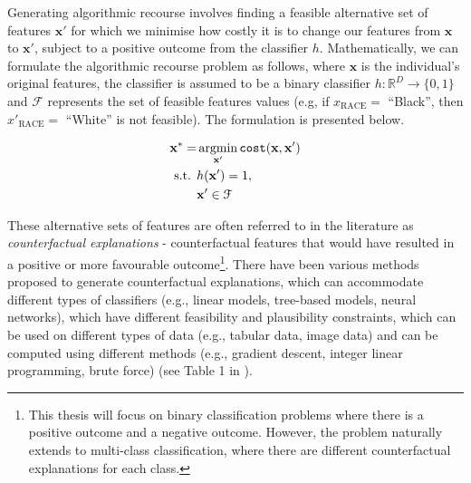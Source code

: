 Generating algorithmic recourse involves finding a feasible alternative set of features $\mathbf{x}'$ for which we minimise how costly it is to change our features from $\mathbf{x}$ to $\mathbf{x}'$, subject to a positive outcome from the classifier $h$. Mathematically, we can formulate the algorithmic recourse problem as follows, where $\mathbf{x}$ is the individual's original features, the classifier is assumed to be a binary classifier $h: \mathbb{R}^D \to \{0,1\}$ and $\mathcal{F}$ represents the set of feasible features values (e.g, if $x_{\text{RACE}}=$ ``Black'', then $x'_{\text{RACE}}=$ ``White'' is not feasible). The formulation is presented below.

\begin{align}
	\mathbf{x}^* = & \operatorname*{argmin}_{\mathbf{x}'}  \texttt{cost}(\mathbf{x}, \mathbf{x}') \\ \nonumber
	\text{s.t. } & h(\mathbf{x}') = 1, \\ \nonumber
	& \mathbf{x}' \in \mathcal{F}
\end{align}


These alternative sets of features are often referred to in the literature as \textit{counterfactual explanations} - counterfactual features that would have resulted in a positive or more favourable outcome\footnote{This thesis will focus on binary classification problems where there is a positive outcome and a negative outcome. However, the problem naturally extends to multi-class classification, where there are different counterfactual explanations for each class.}. There have been various methods proposed to generate counterfactual explanations, which can accommodate different types of classifiers (e.g., linear models, tree-based models, neural networks), which have different feasibility and plausibility constraints, which can be used on different types of data (e.g., tabular data, image data) and can be computed using different methods (e.g., gradient descent, integer linear programming, brute force) (see Table 1 in \textcite{karimiSurveyAlgorithmicRecourse2022}).\\

